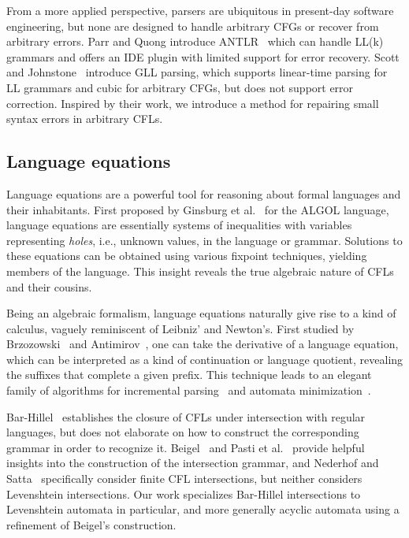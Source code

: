 \documentclass[sigplan,acmsmall,nonacm,screen]{acmart}\settopmatter{printfolios=false,printccs=false,printacmref=false}
\begin{document}

  From a more applied perspective, parsers are ubiquitous in present-day software engineering, but none are designed to handle arbitrary CFGs or recover from arbitrary errors. Parr and Quong introduce ANTLR~\cite{parr1995antlr} which can handle LL(k) grammars and offers an IDE plugin with limited support for error recovery. Scott and Johnstone~\cite{scott2010gll} introduce GLL parsing, which supports linear-time parsing for LL grammars and cubic for arbitrary CFGs, but does not support error correction. Inspired by their work, we introduce a method for repairing small syntax errors in arbitrary CFLs.

  \subsection{Language equations}

  Language equations are a powerful tool for reasoning about formal languages and their inhabitants. First proposed by Ginsburg et al.~\cite{ginsburg1962two} for the ALGOL language, language equations are essentially systems of inequalities with variables representing \textit{holes}, i.e., unknown values, in the language or grammar. Solutions to these equations can be obtained using various fixpoint techniques, yielding members of the language. This insight reveals the true algebraic nature of CFLs and their cousins.

  Being an algebraic formalism, language equations naturally give rise to a kind of calculus, vaguely reminiscent of Leibniz' and Newton's. First studied by Brzozowski~\cite{brzozowski1964derivatives, brzozowski1980equations} and Antimirov~\cite{antimirov1996partial}, one can take the derivative of a language equation, which can be interpreted as a kind of continuation or language quotient, revealing the suffixes that complete a given prefix. This technique leads to an elegant family of algorithms for incremental parsing~\cite{might2011parsing, adams2016complexity} and automata minimization~\cite{brzozowski1962canonical}.

  Bar-Hillel~\cite{bar1961formal} establishes the closure of CFLs under intersection with regular languages, but does not elaborate on how to construct the corresponding grammar in order to recognize it. Beigel~\cite{beigelproof} and Pasti et al.~\cite{pasti2023intersection} provide helpful insights into the construction of the intersection grammar, and Nederhof and Satta~\cite{nederhof2004language} specifically consider finite CFL intersections, but neither considers Levenshtein intersections. Our work specializes Bar-Hillel intersections to Levenshtein automata in particular, and more generally acyclic automata using a refinement of Beigel's construction.
\end{document}
